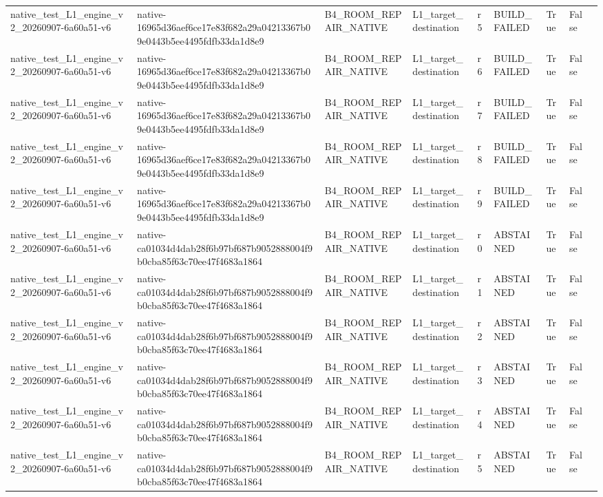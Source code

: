 \begin{tabular}{lllllllll}
native\_test\_L1\_engine\_v2\_20260907-6a60a51-v6 & native-16965d36aef6ce17e83f682a29a04213367b09e0443b5ee4495fdfb33da1d8e9 & B4\_ROOM\_REPAIR\_NATIVE & L1\_target\_destination & r5 & BUILD\_FAILED & True & False &  \\
native\_test\_L1\_engine\_v2\_20260907-6a60a51-v6 & native-16965d36aef6ce17e83f682a29a04213367b09e0443b5ee4495fdfb33da1d8e9 & B4\_ROOM\_REPAIR\_NATIVE & L1\_target\_destination & r6 & BUILD\_FAILED & True & False &  \\
native\_test\_L1\_engine\_v2\_20260907-6a60a51-v6 & native-16965d36aef6ce17e83f682a29a04213367b09e0443b5ee4495fdfb33da1d8e9 & B4\_ROOM\_REPAIR\_NATIVE & L1\_target\_destination & r7 & BUILD\_FAILED & True & False &  \\
native\_test\_L1\_engine\_v2\_20260907-6a60a51-v6 & native-16965d36aef6ce17e83f682a29a04213367b09e0443b5ee4495fdfb33da1d8e9 & B4\_ROOM\_REPAIR\_NATIVE & L1\_target\_destination & r8 & BUILD\_FAILED & True & False &  \\
native\_test\_L1\_engine\_v2\_20260907-6a60a51-v6 & native-16965d36aef6ce17e83f682a29a04213367b09e0443b5ee4495fdfb33da1d8e9 & B4\_ROOM\_REPAIR\_NATIVE & L1\_target\_destination & r9 & BUILD\_FAILED & True & False &  \\
native\_test\_L1\_engine\_v2\_20260907-6a60a51-v6 & native-ca01034d4dab28f6b97bf687b9052888004f9b0cba85f63c70ee47f4683a1864 & B4\_ROOM\_REPAIR\_NATIVE & L1\_target\_destination & r0 & ABSTAINED & True & False &  \\
native\_test\_L1\_engine\_v2\_20260907-6a60a51-v6 & native-ca01034d4dab28f6b97bf687b9052888004f9b0cba85f63c70ee47f4683a1864 & B4\_ROOM\_REPAIR\_NATIVE & L1\_target\_destination & r1 & ABSTAINED & True & False &  \\
native\_test\_L1\_engine\_v2\_20260907-6a60a51-v6 & native-ca01034d4dab28f6b97bf687b9052888004f9b0cba85f63c70ee47f4683a1864 & B4\_ROOM\_REPAIR\_NATIVE & L1\_target\_destination & r2 & ABSTAINED & True & False &  \\
native\_test\_L1\_engine\_v2\_20260907-6a60a51-v6 & native-ca01034d4dab28f6b97bf687b9052888004f9b0cba85f63c70ee47f4683a1864 & B4\_ROOM\_REPAIR\_NATIVE & L1\_target\_destination & r3 & ABSTAINED & True & False &  \\
native\_test\_L1\_engine\_v2\_20260907-6a60a51-v6 & native-ca01034d4dab28f6b97bf687b9052888004f9b0cba85f63c70ee47f4683a1864 & B4\_ROOM\_REPAIR\_NATIVE & L1\_target\_destination & r4 & ABSTAINED & True & False &  \\
native\_test\_L1\_engine\_v2\_20260907-6a60a51-v6 & native-ca01034d4dab28f6b97bf687b9052888004f9b0cba85f63c70ee47f4683a1864 & B4\_ROOM\_REPAIR\_NATIVE & L1\_target\_destination & r5 & ABSTAINED & True & False &  \\

\end{tabular}

